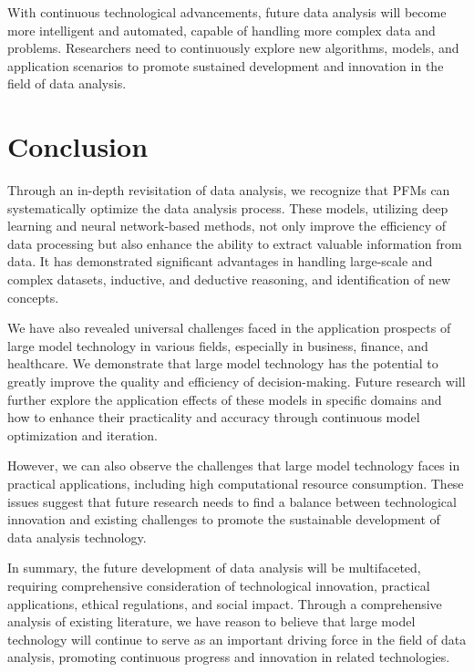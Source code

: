   With continuous technological advancements, future data analysis will become more intelligent and automated, capable of handling more complex data and problems. Researchers need to continuously explore new algorithms, models, and application scenarios to promote sustained development and innovation in the field of data analysis.
  
  \section{Conclusion}
  
  Through an in-depth revisitation of data analysis, we recognize that PFMs can systematically optimize the data analysis process. These models, utilizing deep learning and neural network-based methods, not only improve the efficiency of data processing but also enhance the ability to extract valuable information from data. It has demonstrated significant advantages in handling large-scale and complex datasets, inductive, and deductive reasoning, and identification of new concepts.
  
  We have also revealed universal challenges faced in the application prospects of large model technology in various fields, especially in business, finance, and healthcare. We demonstrate that large model technology has the potential to greatly improve the quality and efficiency of decision-making. Future research will further explore the application effects of these models in specific domains and how to enhance their practicality and accuracy through continuous model optimization and iteration.
  
  
  However, we can also observe the challenges that large model technology faces in practical applications, including high computational resource consumption. These issues suggest that future research needs to find a balance between technological innovation and existing challenges to promote the sustainable development of data analysis technology.
  
  
  In summary, the future development of data analysis will be multifaceted, requiring comprehensive consideration of technological innovation, practical applications, ethical regulations, and social impact. Through a comprehensive analysis of existing literature, we have reason to believe that large model technology will continue to serve as an important driving force in the field of data analysis, promoting continuous progress and innovation in related technologies.
  
  
  
  \printbibliography
  
  
  
  
  